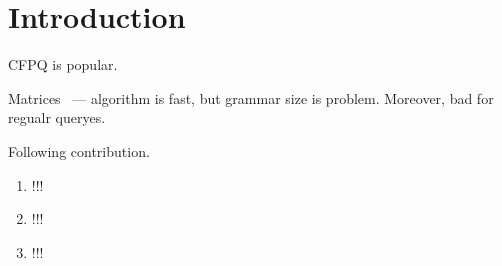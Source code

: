 \section{Introduction}

CFPQ is popular.

Matrices~\cite{Azimov:2018:CPQ:3210259.3210264} --- algorithm is fast, but grammar size is problem.
Moreover, bad for regualr queryes.

Following contribution.
\begin{enumerate}
\item !!!
\item !!!
\item !!!
\end{enumerate}

